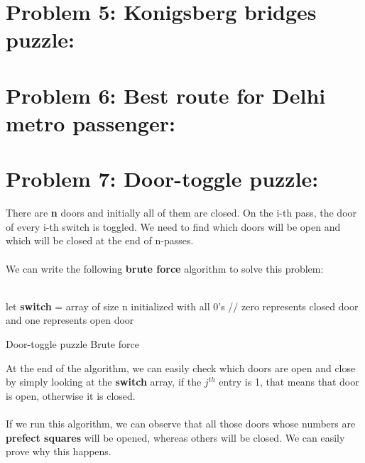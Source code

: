 \documentclass[12pt]{report}
\begin{document}
\section{Problem 5: Konigsberg bridges puzzle:}

\section{Problem 6: Best route for Delhi metro passenger:}

\section{Problem 7: Door-toggle puzzle:}
There are \textbf{n} doors and initially all of them are closed. On the i-th pass, the door of every i-th switch is toggled. We need to find which doors will be open and which will be closed at the end of n-passes.  
\\ \\
We can write the following \textbf{brute force} algorithm to solve this problem:
\\ \\
\begin{algorithm}[H]
	\SetAlgoLined
	let \textbf{switch} = array of size n initialized with all 0's \; 
	// zero represents closed door and one represents open door \\
	\caption{Door-toggle puzzle Brute force}	
\end{algorithm}
At the end of the algorithm, we can easily check which doors are open and close by simply looking at the \textbf{switch} array, if the $j^{th}$ entry is 1, that means that door is open, otherwise it is closed.
\\ \\ 
If we run this algorithm, we can observe that all those doors whose numbers are \textbf{prefect squares} will be opened, whereas others will be closed. We can easily prove why this happens. 
\end{document}

